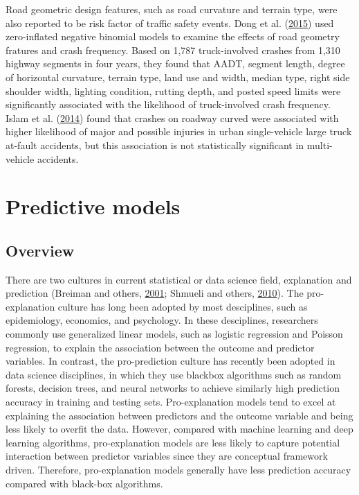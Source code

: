\documentclass[12pt]{book}
\numberwithin{equation}{chapter}
\begin{document}
Road geometric design features, such as road curvature and terrain type, were also reported to be risk factor of traffic safety events. Dong et al. (\protect\hyperlink{ref-dong2015assessment}{2015}) used zero-inflated negative binomial models to examine the effects of road geometry fratures and crash frequency. Based on 1,787 truck-involved crashes from 1,310 highway segments in four years, they found that AADT, segment length, degree of horizontal curvature, terrain type, land use and width, median type, right side shoulder width, lighting condition, rutting depth, and posted speed limits were significantly associated with the likelihood of truck-involved crash frequency. Islam et al. (\protect\hyperlink{ref-islam2014comprehensive}{2014}) found that crashes on roadway curved were associated with higher likelihood of major and possible injuries in urban single-vehicle large truck at-fault accidents, but this association is not statistically significant in multi-vehicle accidents.

\hypertarget{predictive-models}{%
\section{Predictive models}\label{predictive-models}}

\hypertarget{overview}{%
\subsection{Overview}\label{overview}}

There are two cultures in current statistical or data science field, explanation and prediction (Breiman and others, \protect\hyperlink{ref-breiman2001statistical}{2001}; Shmueli and others, \protect\hyperlink{ref-shmueli2010explain}{2010}). The pro-explanation culture has long been adopted by most desciplines, such as epidemiology, economics, and psychology. In these desciplines, researchers commonly use generalized linear models, such as logistic regression and Poisson regression, to explain the association between the outcome and predictor variables. In contrast, the pro-prediction culture has recently been adopted in data science disciplines, in which they use blackbox algorithms such as random forests, decision trees, and neural networks to achieve similarly high prediction accuracy in training and testing sets. Pro-explanation models tend to excel at explaining the association between predictors and the outcome variable and being less likely to overfit the data. However, compared with machine learning and deep learning algorithms, pro-explanation models are less likely to capture potential interaction between predictor variables since they are conceptual framework driven. Therefore, pro-explanation models generally have less prediction accuracy compared with black-box algorithms.
\end{document}
